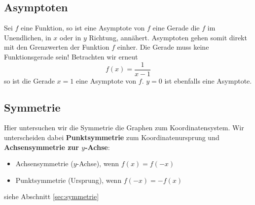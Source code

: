 \subsection{Asymptoten}
Sei $f$ eine Funktion, so ist eine Asymptote von $f$ eine Gerade die $f$ im Unendlichen, in $x$ oder in $y$ Richtung, annähert. Asymptoten gehen somit direkt mit den Grenzwerten der Funktion $f$ einher. Die Gerade muss keine Funktionsgerade sein! Betrachten wir erneut 
\begin{equation*}
f(x) = \frac{1}{x-1}
\end{equation*}
so ist die Gerade $x=1$ eine Asymptote von $f$. $y=0$ ist ebenfalls eine Asymptote.

 \subsection{Symmetrie}
 Hier untersuchen wir die Symmetrie die Graphen zum Koordinatensystem. Wir unterscheiden dabei \textbf{Punktsymmetrie} zum Koordinatenursprung und \textbf{Achsensymmetrie zur $y$-Achse}:
 \begin{itemize}
 \item Achsensymmetrie ($y$-Achse), wenn $f(x)=f(-x)$
 \item Punktsymmetrie (Ursprung), wenn $f(-x)=-f(x)$
 \end{itemize}
 siehe Abschnitt \ref{sec:symmetrie}


